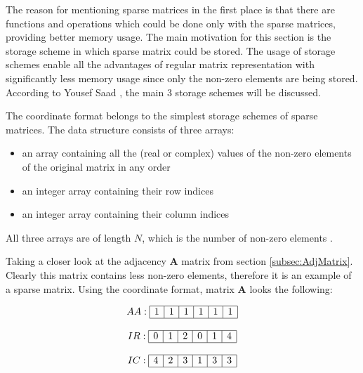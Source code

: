 \documentclass[thesis=M,english]{FITthesis}[2012/10/20]
\begin{document}
The reason for mentioning sparse matrices in the first place is that there are functions and operations which could be done only with the sparse matrices, providing better memory usage. The main motivation for this section is the storage scheme in which sparse matrix could be stored. The usage of storage schemes enable all the advantages of regular matrix representation with significantly less memory usage since only the non-zero elements are being stored. According to Yousef Saad \cite{Saad03}, the main 3 storage schemes will be discussed. 

The coordinate format belongs to the simplest storage schemes of sparse matrices. The data structure consists of three arrays: 
\begin{itemize}
\item an array containing all the (real or complex) values of the non-zero elements of the original matrix in any order
\item an integer array containing their row indices 
\item an integer array containing their column indices
\end{itemize}
All three arrays are of length $N$, which is the number of non-zero elements \cite{Saad03}.

Taking a closer look at the adjacency $\textbf{A}$ matrix from section \ref{subsec:AdjMatrix}. Clearly this matrix contains less non-zero elements, therefore it is an example of a sparse matrix. Using the coordinate format, matrix $\textbf{A}$ looks the following:

$$
\begin{array}{c}

AA:
\begin{array}{|c|c|c|c|c|c|}
 \hline
 1 & 1 & 1 & 1 & 1 & 1 \\
 \hline
\end{array}
\\ \\
IR:
\begin{array}{|c|c|c|c|c|c|}
 \hline
 0 & 1 & 2 & 0 & 1 & 4 \\
 \hline
\end{array}
\\ \\
IC:
\begin{array}{|c|c|c|c|c|c|}
 \hline
 4 & 2 & 3 & 1 & 3 & 3 \\
 \hline
\end{array}
\end{array}
$$
\end{document}

